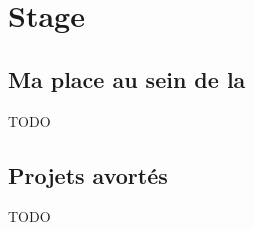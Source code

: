 \chapter{Stage}

\section{Ma place au sein de la \abusys}

TODO











\section{Projets avortés}

TODO


